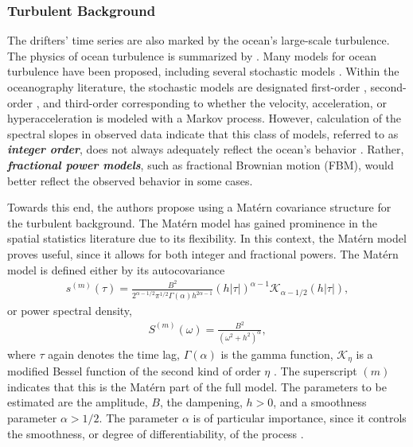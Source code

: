 \documentclass{stat572Style}
\begin{document}
\subsubsection{Turbulent Background}
The drifters' time series are also marked by the ocean's large-scale turbulence. 
The physics of ocean turbulence is summarized by \citet{Rhines1979}. 
Many models for ocean turbulence have been proposed, including several stochastic models \citep{Lacasce2008}. 
Within the oceanography literature, the stochastic models are designated  first-order \citep{Griffa1995, Falco2000}, second-order \citep{Sawford1991}, and third-order corresponding to  whether the velocity, acceleration, or hyperacceleration is modeled with a Markov process. 
However, calculation of the spectral slopes in observed data indicate that this class of models, referred to as \textbf{\it{integer order}},  does not always adequately reflect the ocean's behavior \citep{Rupolo1996, Sanderson1991}. Rather, \textbf{\it{fractional power models}}, such as fractional Brownian motion (FBM), would better reflect the observed behavior in some cases. 

Towards this end, the authors propose using a Mat\'{e}rn covariance structure \citep{Gneiting2012} for the turbulent background. 
The Mat\'{e}rn model has gained prominence in the spatial statistics literature due to its flexibility.
 In this context, the Mat\'{e}rn model proves useful, since it allows for both integer and fractional powers. 
 The Mat\'{e}rn model is defined either by its autocovariance 
\begin{align}
\label{eq:maternAC}
s^{(m)}(\tau) = \frac{B^{2}}{2^{\alpha - 1/2}\pi^{1/2} \Gamma(\alpha) h^{2 \alpha - 1}}(h|\tau|)^{\alpha - 1}\mathcal{K}_{\alpha - 1/2}(h|\tau|),
\end{align}
or power spectral density,
\begin{align}
\label{eq:maternPSD}
S^{(m)}(\omega) = \frac{B^{2}}{(\omega^{2} + h^{2})^{\alpha}},
\end{align}
where $\tau$ again denotes the time lag, $\Gamma(\alpha)$ is the gamma function,  $\mathcal{K}_{\eta}$ is a modified Bessel function of the second kind of order $\eta$ \citep{Stein2012}.  The superscript $(m)$ indicates that this is the Mat\'{e}rn part of the full model. 
The parameters to be estimated are the amplitude, $B$, the dampening, $h > 0$, and a smoothness parameter $\alpha > 1/2$.
 The parameter $\alpha$ is of particular importance, since it controls the smoothness, or degree of differentiability, of the process \citep{Fuentes2010}. 
\end{document}

